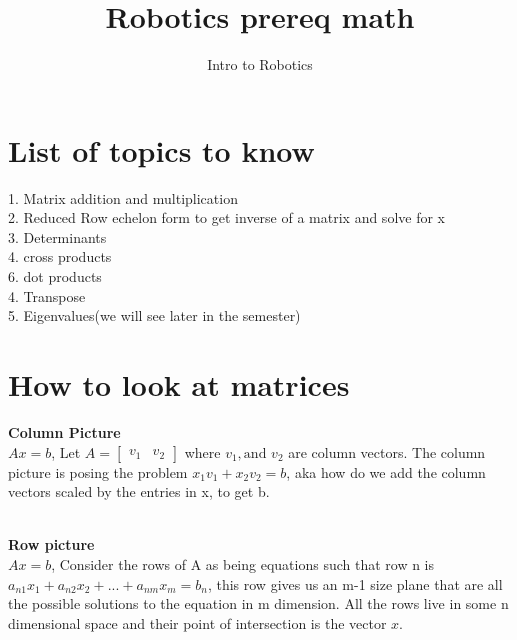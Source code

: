 \documentclass{article}
\title{Robotics prereq math}
\author{Intro to Robotics}
\date{}
\begin{document}
\maketitle

\section{List of topics to know}
1. Matrix addition and multiplication\\
2. Reduced Row echelon form to get inverse of a matrix and solve for x\\
3. Determinants\\ 
4. cross products\\
6. dot products\\
4. Transpose \\
5. Eigenvalues(we will see later in the semester)\\

\section{How to look at matrices}
\textbf{Column Picture}\\
$Ax=b$, Let $A = \begin{bmatrix}v_1 &v_2\end{bmatrix}$ where $v_1, \text{and } v_2$ are column vectors. The column picture is posing the problem $x_1v_1+x_2v_2=b$, aka how do we add the column vectors scaled by the entries in x, to get b.\\\\
\newpage
\textbf{Row picture}\\
$Ax=b$, Consider the rows of A as being equations such that row n is $a_{n1}x_1+a_{n2}x_2+...+a_{nm}x_m=b_n$, this row gives us an m-1 size plane that are all the possible solutions to the equation in m dimension. All the rows live in some n dimensional space and their point of intersection is the vector $x$.\\\\
 \\\\
\end{document}
